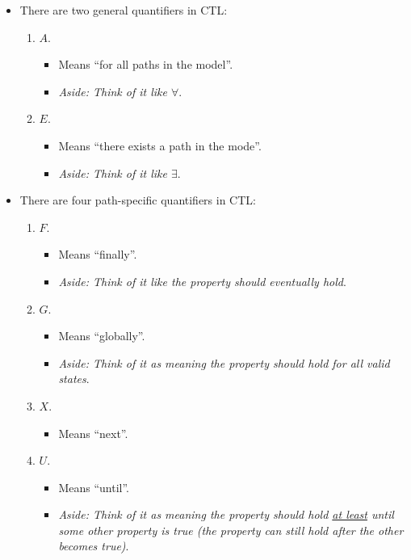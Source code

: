 \documentclass{article}
\begin{document}
\begin{itemize}
\begin{enumerate}
\begin{itemize}
			\item Quantifies along a given path from the current state.
		\end{itemize}
	\end{enumerate}
	\item There are two general quantifiers in CTL:
	\begin{enumerate}
		\item $A$.
		\begin{itemize}
			\item Means ``for all paths in the model''.
			\item \emph{Aside: Think of it like $\forall$}.
		\end{itemize}
		\item $E$.
		\begin{itemize}
			\item Means ``there exists a path in the mode''.
			\item \emph{Aside: Think of it like $\exists$}.
		\end{itemize}
	\end{enumerate}
	\item There are four path-specific quantifiers in CTL:
	\begin{enumerate}
		\item $F$.
		\begin{itemize}
			\item Means ``finally''.
			\item \emph{Aside: Think of it like the property should eventually hold}.
		\end{itemize}
		\item $G$.
		\begin{itemize}
			\item Means ``globally''.
			\item \emph{Aside: Think of it as meaning the property should hold for all valid states}.
		\end{itemize}
		\item $X$.
		\begin{itemize}
			\item Means ``next''.
		\end{itemize}
		\item $U$.
		\begin{itemize}
			\item Means ``until''.
			\item \emph{Aside: Think of it as meaning the property should hold \underline{at least} until some other property is true (the property can still hold after the other becomes true)}.

\end{itemize}
\end{enumerate}
\end{itemize}
\end{document}
